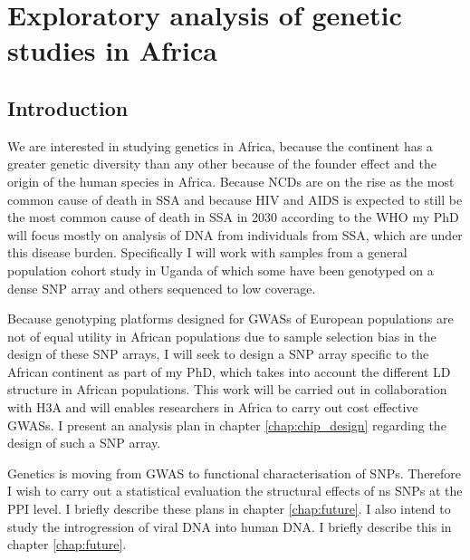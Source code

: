 \chapter{Exploratory analysis of genetic studies in Africa}

\section{Introduction}

We are interested in studying genetics in Africa, because the continent has a greater genetic diversity than any other because of the founder effect and the origin of the human species in Africa\cite{1000G2012}\cite{Gurdasani2015}\cite{Tishkoff22052009}\cite{Stringer2003}. Because \glspl{NCD} are on the rise as the most common cause of death in \gls{SSA} and because \gls{HIV} and \gls{AIDS} is expected to still be the most common cause of death in \gls{SSA} in 2030 according to the \gls{WHO}\cite{10.1371/journal.pmed.0030442} %
my PhD will focus mostly on analysis of DNA from individuals from \gls{SSA}, which are under this disease burden. Specifically I will work with samples from a general population cohort study in Uganda\cite{Asiki01022013} of which some have been genotyped on a dense SNP array and others sequenced to low coverage.

Because genotyping platforms designed for \glspl{GWAS} of European populations are not of equal utility in African populations due to sample selection bias in the design of these \gls{SNP} arrays, I will seek to design a \gls{SNP} array specific to the African continent as part of my PhD, which takes into account the different \gls{LD} structure in African populations. This work will be carried out in collaboration with \acrfull{H3A} and will enables researchers in Africa to carry out cost effective \glspl{GWAS}. I present an analysis plan in chapter \ref{chap:chip_design} regarding the design of such a \gls{SNP} array.

Genetics is moving from \gls{GWAS} to functional characterisation of \glspl{SNP}. Therefore I wish to carry out a statistical evaluation the structural effects of \gls{ns} \glspl{SNP} at the \gls{PPI} level. I briefly describe these plans in chapter \ref{chap:future}. I also intend to study the introgression of viral DNA into human DNA. I briefly describe this in chapter \ref{chap:future}.

